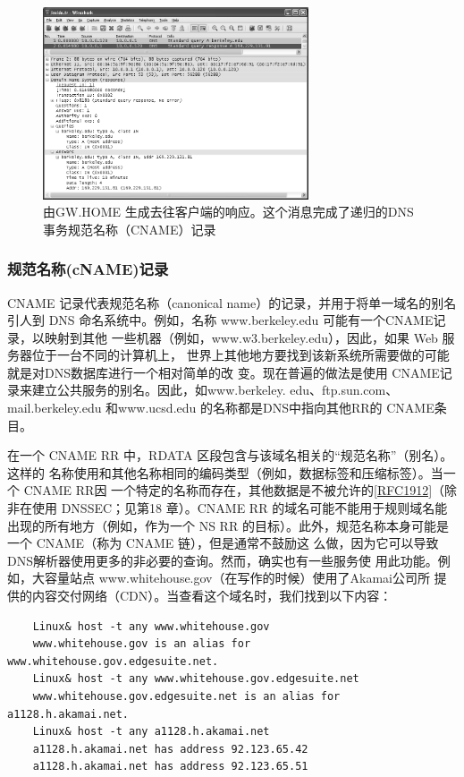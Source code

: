 \begin{figure}[!htb]
    \centering
	\includegraphics[width=0.7\textwidth]{imgs/11/11-13.png}
	\caption{由GW.HOME 生成去往客户端的响应。这个消息完成了递归的DNS 事务规范名称（CNAME）记录}
\end{figure}

\subsubsection{规范名称(cNAME)记录}

CNAME 记录代表规范名称（canonical name）的记录，并用于将单一域名的别名引人到
DNS 命名系统中。例如，名称 www.berkeley.edu 可能有一个CNAME记录，以映射到其他
一些机器（例如，www.w3.berkeley.edu），因此，如果 Web 服务器位于一台不同的计算机上，
世界上其他地方要找到该新系统所需要做的可能就是对DNS数据库进行一个相对简单的改
变。现在普遍的做法是使用 CNAME记录来建立公共服务的别名。因此，如www.berkeley.
edu、ftp.sun.com、mail.berkeley.edu 和www.ucsd.edu 的名称都是DNS中指向其他RR的
CNAME条目。

在一个 CNAME RR 中，RDATA 区段包含与该域名相关的“规范名称”（别名）。这样的
名称使用和其他名称相同的编码类型（例如，数据标签和压缩标签）。当一个 CNAME RR因
一个特定的名称而存在，其他数据是不被允许的\href{https://www.rfc-editor.org/rfc/rfc1912}{[RFC1912]}（除非在使用 DNSSEC；见第18
章）。CNAME RR 的域名可能不能用于规则域名能出现的所有地方（例如，作为一个 NS RR
的目标）。此外，规范名称本身可能是一个 CNAME（称为 CNAME 链），但是通常不鼓励这
么做，因为它可以导致DNS解析器使用更多的非必要的查询。然而，确实也有一些服务使
用此功能。例如，大容量站点 www.whitehouse.gov（在写作的时候）使用了Akamai公司所
提供的内容交付网络（CDN）\footnotemark。当查看这个域名时，我们找到以下内容：

\begin{verbatim}
    Linux& host -t any www.whitehouse.gov
    www.whitehouse.gov is an alias for www.whitehouse.gov.edgesuite.net.
    Linux& host -t any www.whitehouse.gov.edgesuite.net
    www.whitehouse.gov.edgesuite.net is an alias for a1128.h.akamai.net.
    Linux& host -t any a1128.h.akamai.net
    a1128.h.akamai.net has address 92.123.65.42
    a1128.h.akamai.net has address 92.123.65.51
\end{verbatim}

